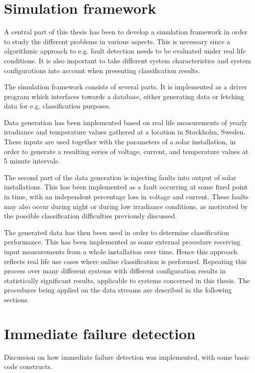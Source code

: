 \section{Simulation framework}
A central part of this thesis has been to develop a simulation framework in order to study the different problems in various aspects.
This is necessary since a algorithmic approach to e.g. fault detection needs to be evaluated under real life conditions.
It is also important to take different system characteristics and system configurations into account when presenting classification results.

The simulation framework consists of several parts.
It is implemented as a driver program which interfaces towards a database, either generating data or fetching data for e.g. classification purposes.

Data generation has been implemented based on real life measurements of yearly irradiance and temperature values gathered at a location in Stockholm, Sweden.
These inputs are used together with the parameters of a solar installation, in order to generate a resulting series of voltage, current, and temperature values at 5 minute intervals.


The second part of the data generation is injecting faults into output of solar installations.
This has been implemented as a fault occurring at some fixed point in time, with an independent percentage loss in voltage and current.
These faults may also occur during night or during low irradiance conditions, as motivated by the possible classification difficulties previously discussed.

The generated data has then been used in order to determine classification performance.
This has been implemented as some external procedure receiving input measurements from a whole installation over time.
Hence this approach reflects real life use cases where online classification is performed.
Repeating this process over many different systems with different configuration results in statistically significant results, applicable to systems concerned in this thesis.
The procedures being applied on the data streams are described in the following sections.

\section{Immediate failure detection}
Discussion on how immediate failure detection was implemented, with some basic code constructs.

